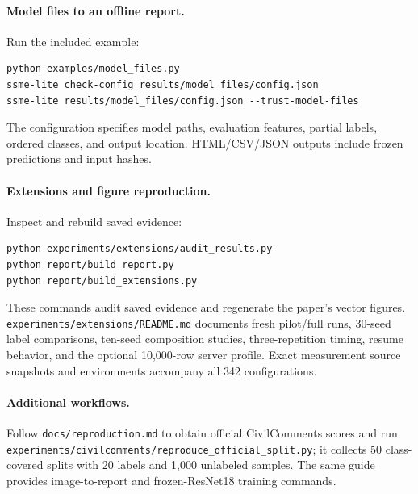\paragraph{Model files to an offline report.} Run the included example:
\begin{lstlisting}[basicstyle=\ttfamily\footnotesize]
python examples/model_files.py
ssme-lite check-config results/model_files/config.json
ssme-lite results/model_files/config.json --trust-model-files
\end{lstlisting}
The configuration specifies model paths, evaluation features, partial labels,
ordered classes, and output location. HTML/CSV/JSON outputs include frozen
predictions and input hashes.

\paragraph{Extensions and figure reproduction.} Inspect and rebuild saved evidence:
\begin{lstlisting}[basicstyle=\ttfamily\footnotesize]
python experiments/extensions/audit_results.py
python report/build_report.py
python report/build_extensions.py
\end{lstlisting}
These commands audit saved evidence and regenerate the paper's vector figures.
\nolinkurl{experiments/extensions/README.md} documents fresh pilot/full runs,
30-seed label comparisons, ten-seed composition studies, three-repetition timing,
resume behavior, and the optional 10,000-row server profile. Exact measurement
source snapshots and environments accompany all 342 configurations.

\paragraph{Additional workflows.}
Follow \nolinkurl{docs/reproduction.md} to obtain official CivilComments scores
and run \nolinkurl{experiments/civilcomments/reproduce_official_split.py}; it
collects 50 class-covered splits with 20 labels and 1,000 unlabeled samples.
The same guide provides image-to-report and frozen-ResNet18 training commands.
